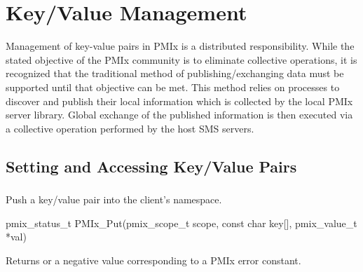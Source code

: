 \chapter{Key/Value Management}
\label{chap:api_kv_mgmt}

Management of key-value pairs in \ac{PMIx} is a distributed responsibility. While the stated objective of the \ac{PMIx} community is to eliminate collective operations, it is recognized that the traditional method of publishing/exchanging data must be supported until that objective can be met. This method relies on processes to discover and publish their local information which is collected by the local PMIx server library.
Global exchange of the published information is then executed via a collective operation performed by the host \ac{SMS} servers.

\section{Setting and Accessing Key/Value Pairs}
\label{chap:api_kv_mgmt:access}


\subsection{}

\summary

Push a key/value pair into the client's namespace.

\format

\cspecificstart
\begin{codepar}
pmix_status_t
PMIx_Put(pmix_scope_t scope,
         const char key[], pmix_value_t *val)
\end{codepar}
\cspecificend

\begin{arglist}
\end{arglist}

Returns  or a negative value corresponding to a PMIx error constant.

\descr

